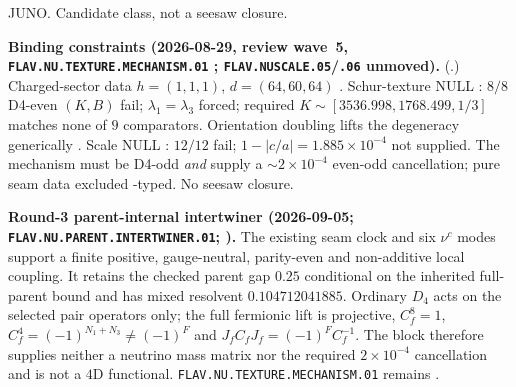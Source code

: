 JUNO.  Candidate class, not a seesaw closure.
\par\smallskip\noindent\textbf{Binding constraints (2026-08-29, review wave~5,
\texttt{FLAV.NU.TEXTURE.MECHANISM.01} \mO; \texttt{FLAV.NUSCALE.05}/\texttt{.06} unmoved).}
(.)
Charged-sector data $h=(1,1,1)$, $d=(64,60,64)$ \mE.  Schur-texture NULL \mX: $8/8$ D4-even
$(K,B)$ fail; $\lambda_1=\lambda_3$ forced; required $K\sim[3536.998,1768.499,1/3]$ matches none
of $9$ comparators.  Orientation doubling lifts the degeneracy generically \mE.  Scale NULL
\mX: $12/12$ fail; $1-\lvert c/a\rvert=1.885{\times}10^{-4}$ not supplied.  The mechanism must
be D4-odd \emph{and} supply a $\sim2{\times}10^{-4}$ even-odd cancellation; pure seam data
excluded \mX-typed.  No seesaw closure.
\par\smallskip\noindent\textbf{Round-3 parent-internal intertwiner
(2026-09-05; \texttt{FLAV.NU.PARENT.INTERTWINER.01};
).}
The existing seam clock and six $\nu^c$ modes support a finite positive,
gauge-neutral, parity-even and non-additive local coupling.  It retains the
checked parent gap $0.25$ conditional on the inherited full-parent bound and has
mixed resolvent $0.104712041885$.  Ordinary $D_4$ acts on the selected pair
operators only; the full fermionic lift is projective,
$C_f^8=1$, $C_f^4=(-1)^{N_1+N_3}\ne(-1)^F$ and
$J_fC_fJ_f=(-1)^F C_f^{-1}$.  The block therefore supplies neither a neutrino
mass matrix nor the required $2{\times}10^{-4}$ cancellation and is not a
$4$D functional.  \texttt{FLAV.NU.TEXTURE.MECHANISM.01} remains \mO.

